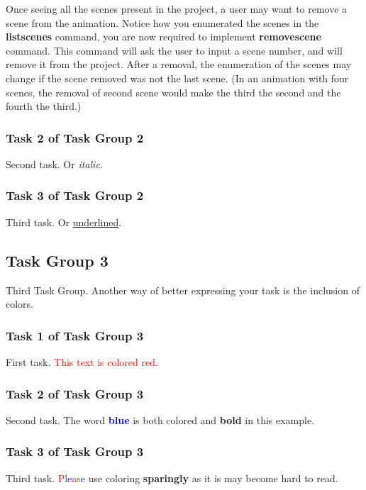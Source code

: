 \documentclass[a4paper]{article}
\begin{document}
	Once seeing all the scenes present in the project, a user may want to remove a scene from the animation. Notice how you enumerated the scenes in the \textbf{listscenes} command, you are now required to implement \textbf{removescene} command. This command will ask the user to input a scene number, and will remove it from the project. After a removal, the enumeration of the scenes may change if the scene removed was not the last scene. (In an animation with four scenes, the removal of second scene would make the third the second and the fourth the third.) \\
	
	
	
	\subsubsection{Task 2 of Task Group 2}
	Second task. Or \emph{italic}.
	
	\subsubsection{Task 3 of Task Group 2}
	Third task. Or \underline{underlined}.
	
	\subsection{Task Group 3}
	Third Task Group. Another way of better expressing your task is the inclusion of colors.
	
	\subsubsection{Task 1 of Task Group 3}
	First task. \textcolor{Red}{This text is colored red.}
	
	\subsubsection{Task 2 of Task Group 3}
	Second task. The word \textbf{\textcolor{Blue}{blue}} is both colored and \textbf{bold} in this example.
	
	\subsubsection{Task 3 of Task Group 3}
	Third task. \textcolor{Red}{P}\textcolor{Green}{l}\textcolor{Blue}{e}\textcolor{Red}{a}\textcolor{Green}{s}\textcolor{Blue}{e} use coloring \textbf{sparingly} as it is may become hard to read.
	
\end{document}
